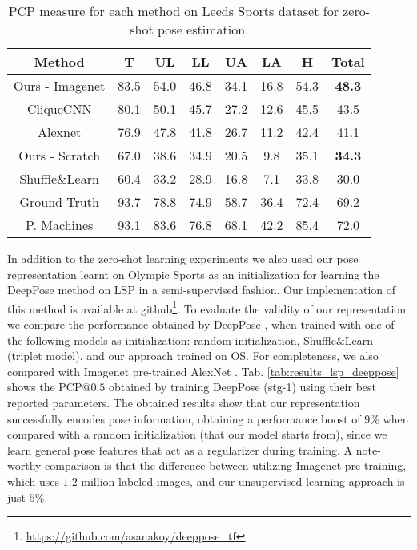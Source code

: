 \documentclass[10pt,twocolumn,letterpaper]{article}
\begin{document}
\begin{table}[!t]
    \scriptsize
    \centering
    \begin{tabular}{|c|c|c|c|c|c|c|c|}
    \hline
    Method  &T &UL &LL &UA &LA &H  &Total \\
    \hline
    Ours - Imagenet & 83.5 & 54.0 & 46.8 & 34.1 & 16.8 & 54.3 &  \textbf{48.3}\\
    \hline
    CliqueCNN \cite{cliquecnn}  & 80.1 & 50.1 & 45.7 & 27.2 & 12.6 &  45.5 &  43.5 \\
    \hline
    Alexnet\cite{alexnet}& 76.9 & 47.8 & 41.8 & 26.7 & 11.2 & 42.4 & 41.1 \\
    \hline
    \hline
    Ours - Scratch & 67.0 & 38.6 & 34.9 & 20.5 & 9.8 & 35.1 &  \textbf{34.3}\\
    \hline
    Shuffle\&Learn \cite{shuffleandlearn}  & 60.4  & 33.2 & 28.9 & 16.8 & 7.1 &  33.8 &  30.0\\
    \hline
    \hline
    Ground Truth & 93.7  & 78.8 & 74.9 & 58.7 & 36.4 & 72.4 & 69.2\\
    \hline
    \hline
    P. Machines \cite{posemachines} & 93.1 & 83.6 & 76.8 & 68.1 & 42.2 & 85.4 & 72.0 \\
    \hline
    \end{tabular}
    \caption{PCP measure for each method on Leeds Sports dataset for zero-shot pose estimation.}
    \label{tab:results_lsp}
\end{table}

In addition to the zero-shot learning experiments we also used our pose representation learnt on Olympic Sports as an initialization for learning the DeepPose method \cite{deeppose} on LSP in a semi-supervised fashion. Our implementation of this method is available at github\footnote{\url{https://github.com/asanakoy/deeppose_tf}}. To evaluate the validity of our representation we compare the performance obtained by DeepPose \cite{deeppose}, when trained with one of the following models as initialization: random initialization, Shuffle\&Learn \cite{shuffleandlearn} (triplet model), and our approach trained on OS. For completeness, we also compared with Imagenet pre-trained AlexNet \cite{alexnet}. Tab. \ref{tab:results_lsp_deeppose} shows the PCP@$0.5$ obtained by training DeepPose (stg-1) using their best reported parameters. The obtained results show that our representation successfully encodes pose information, obtaining a performance boost of $9\%$ when compared with a random initialization (that our model starts from), since we learn general pose features that act as a regularizer during training. A note-worthy comparison is that the difference between utilizing Imagenet pre-training, which uses $1.2$ million labeled images, and our unsupervised learning approach is just $5\%$.
\end{document}
